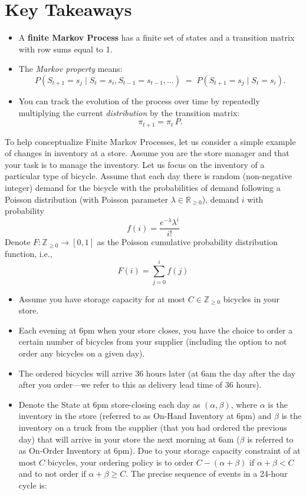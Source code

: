 \section{Key Takeaways}
\begin{itemize}
  \item A \textbf{finite Markov Process} has a finite set of states and a transition matrix with row sums equal to 1.
  \item The \textit{Markov property} means: 
  \[
   P(S_{t+1} = s_j \;\vert\; S_t = s_i, S_{t-1} = s_{t-1}, \dots) 
   \;=\;
   P(S_{t+1} = s_j \;\vert\; S_t = s_i).
  \]
  \item You can track the evolution of the process over time by repeatedly multiplying the current \textit{distribution} by the transition matrix:
  \[
   \pi_{t+1} = \pi_t \, P.
  \]
\end{itemize}



To help conceptualize Finite Markov Processes, let us consider a simple example of changes in inventory at a store. Assume you are the store manager and that your task is to manage the inventory. Let us focus on the inventory of a particular type of bicycle. Assume that each day there is random (non-negative integer) demand for the bicycle with the probabilities of demand following a Poisson distribution (with Poisson parameter $\lambda \in \mathbb{R}_{\geq 0}$), \ie demand $i$ with probability
$$f(i) = \frac {e^{-\lambda} \lambda^i} {i!}$$
Denote $F: \mathbb{Z}_{\geq 0} \rightarrow [0, 1]$ as the Poisson cumulative probability distribution function, i.e.,
 $$F(i) = \sum_{j=0}^i f(j)$$
 \begin{itemize}
	 \item Assume you have storage capacity for at most $C \in \mathbb{Z}_{\geq 0}$ bicycles in your store. 
	 \item Each evening at 6pm when your store closes, you have the choice to order a certain number of bicycles from your supplier (including the option to not order any bicycles on a given day). 
	 \item The ordered bicycles will arrive 36 hours later (at 6am the day after the day after you order—we refer to this as delivery lead time of 36 hours). 
	 \item Denote the State at 6pm store-closing each day as $(\alpha, \beta)$, where $\alpha$ is the inventory in the store (referred to as On-Hand Inventory at 6pm) and $\beta$ is the inventory on a truck from the supplier (that you had ordered the previous day) that will arrive in your store the next morning at 6am ($\beta$ is referred to as On-Order Inventory at 6pm). Due to your storage capacity constraint of at most $C$ bicycles, your ordering policy is to order $C-(\alpha + \beta)$ if $\alpha + \beta < C$ and to not order if $\alpha + \beta \geq C$. The precise sequence of events in a 24-hour cycle is:
 \end{itemize}
 
